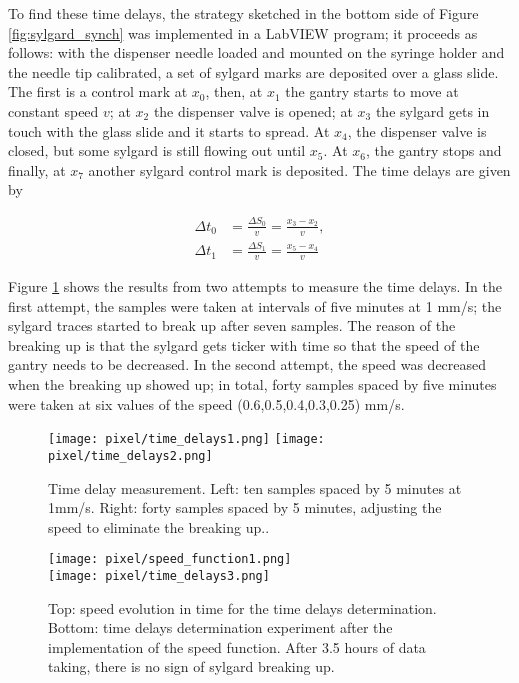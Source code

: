 To find these time delays, the strategy sketched in the bottom side of Figure \ref{fig:sylgard_synch} was implemented in a LabVIEW program; it proceeds as follows: with the dispenser needle loaded and mounted on the syringe holder and the needle tip calibrated, a set of sylgard marks are deposited over a glass slide. The first is a control mark at $x_0$, then, at $x_1$ the gantry starts to move at constant speed $v$; at $x_2$ the dispenser valve is opened; at $x_3$ the sylgard gets in touch with the glass slide and it starts to spread. At $x_4$, the dispenser valve is closed, but some sylgard is still flowing out until $x_5$. At $x_6$, the gantry stops and finally, at $x_7$ another sylgard control mark is deposited. The time delays are given by 

\begin{align}
  \Delta t_0&=\frac{\Delta S_0}{v}=\frac{x_3-x_2}{v},\\
  \Delta t_1&=\frac{\Delta S_1}{v}=\frac{x_5-x_4}{v}
\end{align}

Figure \ref{fig:delays_measure} shows the results from two attempts to measure the time delays. In the first attempt, the samples were taken at intervals of five minutes at 1 mm/s; the sylgard traces started to break up after seven samples. The reason of the breaking up is that the sylgard gets ticker with time so that the speed of the gantry needs to be decreased. In the second attempt, the speed was decreased when the breaking up showed up; in total, forty samples spaced by five minutes were taken at six values of the speed (0.6,0.5,0.4,0.3,0.25) mm/s.

\begin{figure}[h]
  \begin{center}
    \texttt{[image: pixel/time\_delays1.png]} 
    \texttt{[image: pixel/time\_delays2.png]}
    \caption[Time delay measurements.]{Time delay measurement. Left: ten samples spaced by 5 minutes at 1mm/s. Right: forty samples spaced by 5 minutes, adjusting the speed to eliminate the breaking up..}\label{fig:delays_measure}
  \end{center}
\end{figure}

\begin{figure}[h]
  \begin{center}
    \texttt{[image: pixel/speed\_function1.png]}\\ 
    \texttt{[image: pixel/time\_delays3.png]}
    \caption[Speed function for sylgard deposition.]{Top: speed evolution in time for the time delays determination. Bottom: time delays determination experiment after the implementation of the speed function. After 3.5 hours of data taking, there is no sign of sylgard breaking up.}\label{fig:speed_function}
  \end{center}
\end{figure}

